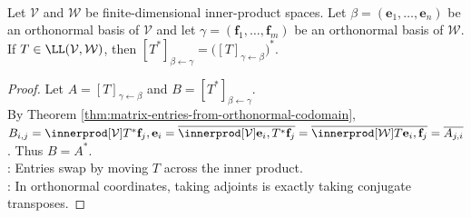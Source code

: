 \begin{theorem} \label{thm:matrix-of-adjoint-is-conjugate-transpose} \\
Let $\mathcal{V}$ and $\mathcal{W}$ be finite-dimensional inner-product spaces. Let $\beta=(\mathbf{e}_1,\ldots,\mathbf{e}_n)$ be an orthonormal basis of $\mathcal{V}$ and let $\gamma=(\mathbf{f}_1,\ldots,\mathbf{f}_m)$ be an orthonormal basis of $\mathcal{W}$. If $T\in\LL(\mathcal{V},\mathcal{W})$, then $[T^*]_{\beta\leftarrow\gamma} =\bigl([T]_{\gamma\leftarrow\beta}\bigr)^*$.
\begin{proof}
Let $A=[T]_{\gamma\leftarrow\beta}$ and $B=[T^*]_{\beta\leftarrow\gamma}$.\\
By Theorem \ref{thm:matrix-entries-from-orthonormal-codomain}, $B_{i,j}=\innerprod[\mathcal{V}]{T^*\mathbf{f}_j,\mathbf{e}_i} =\overline{\innerprod[\mathcal{V}]{\mathbf{e}_i,T^*\mathbf{f}_j}} =\overline{\innerprod[\mathcal{W}]{T\mathbf{e}_i,\mathbf{f}_j}} =\overline{A_{j,i}}$. Thus $B=A^*$.\\
: Entries swap by moving $T$ across the inner product.\\
: In orthonormal coordinates, taking adjoints is exactly taking conjugate transposes.
\end{proof}
\end{theorem}

